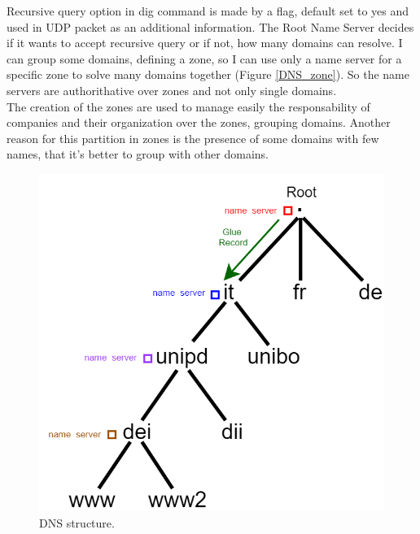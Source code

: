 Recursive query option in dig command is made by a flag, default set to yes and used in UDP packet as an additional information. The Root Name Server decides if it wants to accept recursive query or if not, how many domains can resolve. I can group some domains, defining a zone, so I can use only a name server for a specific zone to solve many domains together (Figure \ref{DNS_zone}). So the name servers are authorithative over zones and not only single domains.\\
The creation of the zones are used to manage easily the responsability of companies and their organization over the zones, grouping domains. Another reason for this partition in zones is the presence of some domains with few names, that it's better to group with other domains.
\begin{figure}[h]
\centering
\includegraphics[scale=0.38]{Images/Resolution/DNS_hierarchy}
\caption{\footnotesize{DNS structure.}}\label{DNS_hierarchy}
\end{figure}

